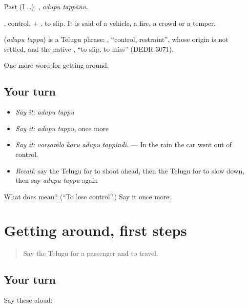 Past (I …):  , \emph{adupu tappānu}.

, control, + , to slip. It is said of a vehicle, a fire, a crowd or a temper.

\begin{cousinweb}
\textbf{ } (\emph{adupu tappu}) is a Telugu phrase: , \textquotedblleft{}control, restraint\textquotedblright{}, whose origin is not settled, and the native , \textquotedblleft{}to slip, to miss\textquotedblright{} (DEDR 3071).
\end{cousinweb}

\begin{grammarlens}[title={What you've built}]
One more word for getting around.
\end{grammarlens}

\subsection*{Your turn}
\begin{itemize}
\raggedright
  \item \emph{Say it:} \emph{adupu tappu}
  \item \emph{Say it:} \emph{adupu tappu}, once more
  \item \emph{Say it:} \emph{varṣaṁlō kāru adupu tappindi.} — In the rain the car went out of control.
  \item \emph{Recall:} say the Telugu for to shoot ahead, then the Telugu for to slow down, then say \emph{adupu tappu} again
\end{itemize}

\begin{tcolorbox}[breakable,colback=teal!4,colframe=teal!35!black,title={Before you move on}]
What does   mean? (\textquotedblleft{}To lose control\textquotedblright{}.) Say it once more.
\end{tcolorbox}
\section[(dialogue)]{Getting around, first steps}

\label{lesson:TE-R445-review-438-445}



\begin{quote}
Say the Telugu for a passenger and to travel.
\end{quote}

\subsection*{Your turn}
Say these aloud:

